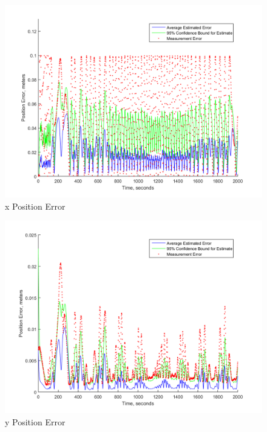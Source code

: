 \documentclass[]{aiaa-tc}%
\begin{document}
\begin{figure}
  \includegraphics[width=\linewidth]{xErrorPlot.png}
  \caption{x Position Error}
  \label{fig:xErrorPlot}
\end{figure}

\begin{figure}
  \includegraphics[width=\linewidth]{yErrorPlot.png}
  \caption{y Position Error}
  \label{fig:yErrorPlot}
\end{figure}
\end{document}
